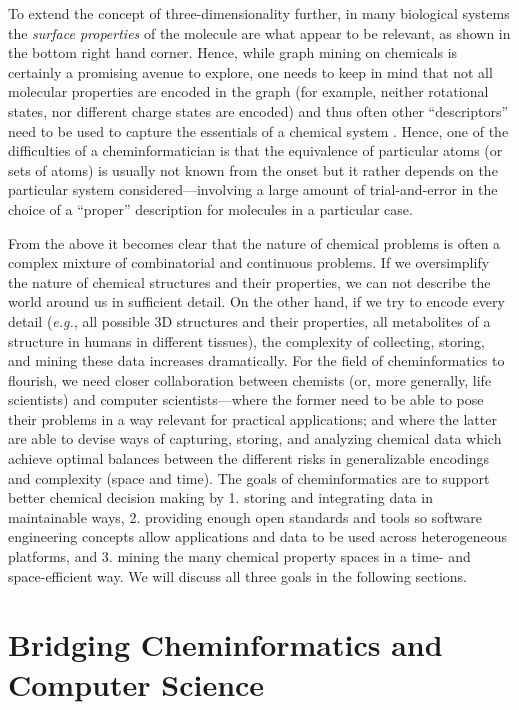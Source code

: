 \documentclass{sig-alternate}
\begin{document}
To extend the concept of three-dimensionality further, in
many biological systems the \emph{surface properties} of the molecule
are what appear to be relevant, as shown in the bottom right hand
corner.  Hence, while graph mining on chemicals is certainly a
promising avenue to explore, one needs to keep in mind that not all
molecular properties are encoded in the graph (for example, neither
rotational states, nor different charge states are encoded) and thus
often other ``descriptors'' need to be used to capture the essentials of
a chemical system \cite{bender2004}. Hence, one of the difficulties of a cheminformatician is that the equivalence of
particular atoms (or sets of atoms) is usually not known from the onset but it rather depends on the particular system
considered---involving a large amount of trial-and-error in the choice of a ``proper'' description for molecules in a
particular case.

From the above it becomes clear that the nature of chemical problems
is often a complex mixture of combinatorial and continuous
problems. If we oversimplify the nature of chemical structures and
their properties, we can not describe the world around us in
sufficient detail. On the other hand, if we try to encode every detail
(\emph{e.g.}, all possible 3D structures and their properties, all
metabolites of a structure in humans in different tissues), the
complexity of collecting, storing, and mining these data increases
dramatically. For the field of cheminformatics to flourish, we need
closer collaboration between chemists (or, more generally, life
scientists) and computer scientists---where the former need to be able
to pose their problems in a way relevant for practical applications;
and where the latter are able to devise ways of capturing, storing,
and analyzing chemical data which achieve optimal balances between the different risks in
generalizable encodings and complexity (space and time). The goals of cheminformatics are to
support better chemical decision making by 1. storing and integrating
data in maintainable ways, 2.  providing enough open standards and
tools so software engineering concepts allow applications and data to
be used across heterogeneous platforms, and 3. mining the many
chemical property spaces in a time- and space-efficient way. We will
discuss all three goals in the following sections.

\section{Bridging Cheminformatics and Computer Science}
\end{document}
